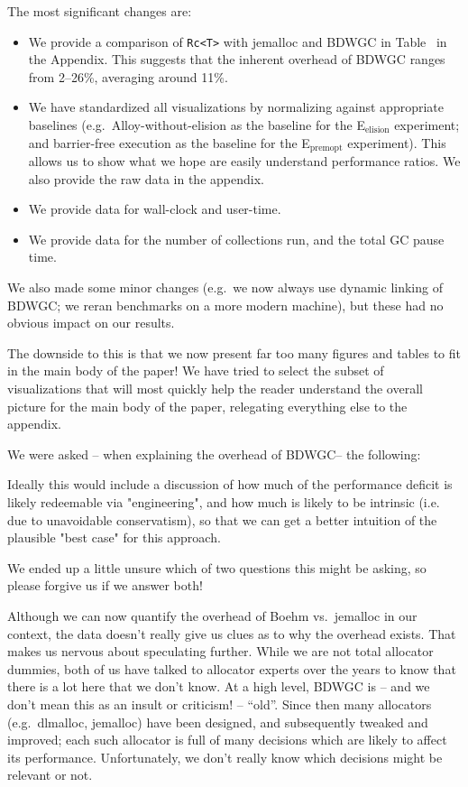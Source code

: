 \documentclass[12pt,a4paper,preprint]{article}
\newcommand\Eelision{E$_\textrm{elision}$\xspace}
\newcommand\Epremopt{E$_\textrm{premopt}$\xspace}
\newcommand\boehm{\textsc{BDWGC}\xspace}
\begin{document}
The most significant changes are:

\begin{itemize}
  \item We provide a comparison of \lstinline{Rc<T>} with jemalloc and \boehm
    in Table~ in the Appendix. This suggests that the inherent
    overhead of \boehm ranges from 2--26\%, averaging around 11\%.

  \item We have standardized all visualizations by normalizing against
    appropriate baselines (e.g.~Alloy-without-elision as the baseline for
    the \Eelision experiment; and barrier-free execution as the baseline
    for the \Epremopt experiment). This allows us to show what we hope
    are easily understand performance ratios. We also provide the raw data
    in the appendix.

  \item We provide data for wall-clock and user-time.

  \item We provide data for the number of collections run, and the total GC
  pause time.
\end{itemize}

We also made some minor changes (e.g.~we now always use dynamic
linking of \boehm; we reran benchmarks on a more modern machine), but
these had no obvious impact on our results.

The downside to this is that we now present far too many figures and tables to
fit in the main body of the paper! We have tried to select the subset of
visualizations that will most quickly help the reader understand the overall
picture for the main body of the paper, relegating everything else to the
appendix.

We were asked -- when explaining the overhead of \boehm -- the following:

\begin{blockquote}
Ideally this would include a
discussion of how much of the performance deficit is likely redeemable via
"engineering", and how much is likely to be intrinsic (i.e. due to
unavoidable conservatism), so that we can get a better intuition of the
plausible "best case" for this approach.
\end{blockquote}

We ended up a little unsure which of two questions this might be asking,
so please forgive us if we answer both!

Although we can now quantify the overhead of Boehm vs.~jemalloc in our context,
the data doesn't really give us clues as to why the overhead exists. That makes
us nervous about speculating further. While we are not total allocator dummies,
both of us have talked to allocator experts over the years to know that there is a lot
here that we don't know. At a high level, \boehm is -- and we don't mean this as an
insult or criticism! -- ``old''. Since then many allocators (e.g.~dlmalloc, jemalloc)
have been designed, and subsequently tweaked and improved; each such allocator
is full of many decisions which are likely to affect its performance. Unfortunately,
we don't really know which decisions might be relevant or not.
\end{document}
